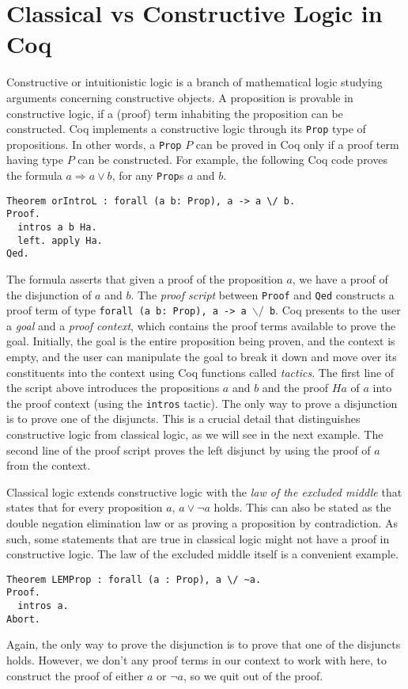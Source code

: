 \documentclass{article}
\begin{document}
	\section{Classical vs Constructive Logic in Coq}
	\label{sec:logic}
	Constructive or intuitionistic logic 
	is a branch of mathematical logic 
	studying arguments concerning 
	constructive objects. A proposition 
	is provable in constructive logic, if 
	a (proof) term inhabiting the 
	proposition can be constructed. 
	Coq implements a constructive 
	logic through its \texttt{Prop}
	type of propositions. In other words,
	a \texttt{Prop} $P$ can be proved in 
	Coq only if a proof term having 
	type $P$ can be constructed.
	For example, the following Coq
	code proves the formula
	$a \Rightarrow a \lor b$, for any 
	\texttt{Prop}s $a$ and $b$.
	\begin{verbatim}
Theorem orIntroL : forall (a b: Prop), a -> a \/ b.
Proof.
  intros a b Ha.
  left. apply Ha.
Qed.
	\end{verbatim}
	The formula asserts that given a 
	proof of the proposition $a$, we
	have a proof of the 
	disjunction of $a$ and $b$. The 
	\textit{proof script} between 
	\texttt{Proof} 
	and \texttt{Qed} constructs a 
	proof term of type \texttt{forall 
	(a b: Prop), a -> a $\backslash/$ b}. 
	Coq presents to the user a 
	\textit{goal} and a \textit{proof 
	context}, which contains the proof 
	terms available to prove the goal.
	Initially, the goal is the entire 
	proposition being proven, and the 
	context is empty, and the user
	can manipulate the goal to break 
	it down and move over its 
	constituents into the context
	using Coq functions called 
	\textit{tactics}. The first line of the 
	script above introduces 
	the propositions $a$ and $b$ and the 
	proof $Ha$ of $a$ into the 
	proof context (using the \texttt{intros}
	tactic). The only way to prove a 
	disjunction is to prove one 
	of the disjuncts. This is a crucial
	detail that distinguishes constructive
	logic from classical logic, as we 
	will see in the next example. 
	The second line of the proof script 
	proves the left disjunct by using 
	the proof of $a$ from the context.
	
	Classical logic extends 
	constructive logic with the 
	\textit{law of the excluded 
	middle} that states that for 
	every proposition $a$, 
	$a \lor \neg a$ holds. This can 
	also be stated as the 
	double negation elimination 
	law or as proving a 
	proposition by contradiction. As
	such, some statements that are true 
	in classical logic might not have 
	a proof in constructive logic.
	The law of the excluded middle
	itself is a convenient example.
	\begin{verbatim}
Theorem LEMProp : forall (a : Prop), a \/ ~a.
Proof.
  intros a. 
Abort.
	\end{verbatim}
	Again, the only way to prove the 
	disjunction is to prove that one 
	of the disjuncts holds. However, 
	we don't any proof terms in our
	context to work 
	with here, to construct the 
	proof of either $a$ or $\neg a$,
	so we quit out of the proof.
	
\end{document}
